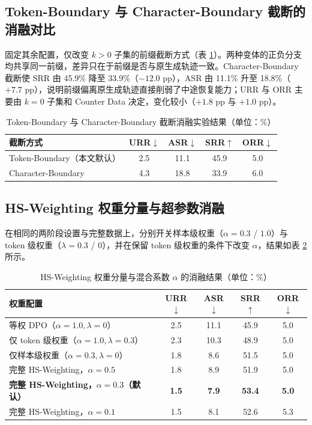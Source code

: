 \documentclass[fontset=fandol,type=master,campus=shenzhen,etitleauto=true]{hithesisbook}
\begin{document}
\subsection{Token-Boundary 与 Character-Boundary 截断的消融对比}\label{token-char-ablation}

固定其余配置，仅改变 $k > 0$ 子集的前缀截断方式（表 \ref{tab:token-char-ablation}）。两种变体的正负分支均共享同一前缀，差异只在于前缀是否与原生成轨迹一致。Character-Boundary 截断使 SRR 由 45.9\% 降至 33.9\%（$-12.0$ pp），ASR 由 11.1\% 升至 18.8\%（$+7.7$ pp），说明前缀偏离原生成轨迹直接削弱了中途恢复能力；URR 与 ORR 主要由 $k = 0$ 子集和 Counter Data 决定，变化较小（$+1.8$ pp 与 $+1.0$ pp）。

\begin{table}[htbp]
\centering
\caption{Token-Boundary 与 Character-Boundary 截断消融实验结果（单位：\%）}
\label{tab:token-char-ablation}
\small
\renewcommand{\arraystretch}{1.1}
\begin{tabular}{l c c c c}
\toprule
\textbf{截断方式} & \textbf{URR$\downarrow$} & \textbf{ASR$\downarrow$} & \textbf{SRR$\uparrow$} & \textbf{ORR$\downarrow$} \\
\midrule
Token-Boundary（本文默认） & 2.5 & 11.1 & 45.9 & 5.0 \\
Character-Boundary & 4.3 & 18.8 & 33.9 & 6.0 \\
\bottomrule
\end{tabular}
\end{table}

\subsection{HS-Weighting 权重分量与超参数消融}\label{rtw-results}

在相同的两阶段设置与完整数据上，分别开关样本级权重（$\alpha = 0.3$ / $1.0$）与 token 级权重（$\lambda = 0.3$ / $0$），并在保留 token 级权重的条件下改变 $\alpha$，结果如表 \ref{tab:rtw-results} 所示。

\begin{table}[htbp]
\centering
\caption{HS-Weighting 权重分量与混合系数 $\alpha$ 的消融结果（单位：\%）}
\label{tab:rtw-results}
\small
\setlength{\tabcolsep}{4pt}
\renewcommand{\arraystretch}{1.15}
\begin{tabular}{l c c c c}
\toprule
\textbf{权重配置} & \textbf{URR$\downarrow$} & \textbf{ASR$\downarrow$} & \textbf{SRR$\uparrow$} & \textbf{ORR$\downarrow$} \\
\midrule
等权 DPO（$\alpha=1.0, \lambda=0$） & 2.5 & 11.1 & 45.9 & 5.0 \\
仅 token 级权重（$\alpha=1.0, \lambda=0.3$） & 2.3 & 10.3 & 48.9 & 5.0 \\
仅样本级权重（$\alpha=0.3, \lambda=0$） & 1.8 & 8.6 & 51.5 & 5.0 \\
\midrule
完整 HS-Weighting，$\alpha=0.5$ & 1.8 & 8.9 & 51.9 & 5.0 \\
\textbf{完整 HS-Weighting，$\alpha=0.3$（默认）} & \textbf{1.5} & \textbf{7.9} & \textbf{53.4} & \textbf{5.0} \\
完整 HS-Weighting，$\alpha=0.1$ & 1.5 & 8.1 & 52.6 & 5.3 \\
\bottomrule
\end{tabular}
\end{table}
\end{document}
